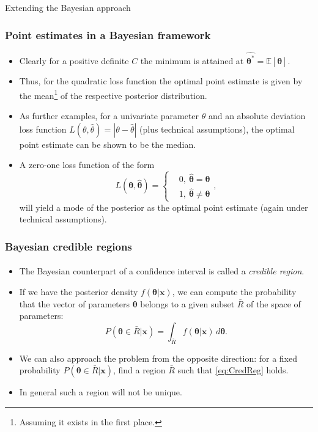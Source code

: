 \documentclass[10pt]{beamer}
\theoremstyle{definition}
\begin{document}
\begin{section}{Extending the Bayesian approach}
\begin{frame}[fragile]
\frametitle{Point estimates in a Bayesian framework}
\begin{itemize}\itemsep1em
\item Clearly for a positive definite $ C $ the minimum is attained at $\boldsymbol{\hat{\theta^*}}=\mathbb{E}[\boldsymbol{\theta}]$.
\item Thus, for the quadratic loss function the optimal point estimate is given by the mean\footnote{Assuming it exists in the first place.} of the respective posterior distribution.\bigskip \pause
\item As further examples, for a univariate parameter $ \theta $ and an absolute deviation loss function $L(\theta,\hat{\theta})=|\theta-\hat{\theta}|$ (plus technical assumptions), the optimal point estimate can be shown to be the median.
\item A zero-one loss function of the form \begin{equation*} L(\boldsymbol{\theta},\boldsymbol{\hat{\theta}})=\left\{ \begin{aligned} &0,~\boldsymbol{\hat{\theta}}=\boldsymbol{\theta}\\ &1,~\boldsymbol{\hat{\theta}}\neq\boldsymbol{\theta} \end{aligned}\right.
,\end{equation*} will yield a mode of the posterior as the optimal point estimate (again under technical assumptions).
\end{itemize}
\end{frame}

\begin{frame}[fragile]
\frametitle{Bayesian credible regions}
\framesubtitle{}
\begin{itemize}\itemsep1em
\item The Bayesian counterpart of a confidence interval is called a \emph{credible region}.
\item If we have the posterior density $f(\boldsymbol{\theta}|\mathbf{x})$, we can compute the probability that the vector of parameters $\boldsymbol{\theta}$ belongs to a given subset $\bar{R}$ of the space of parameters:
\begin{equation}
\label{eq:CredReg} P(\boldsymbol{\theta}\in
\bar{R}|\mathbf{x}) = \int_{\bar{R}}f(\boldsymbol{\theta} | \mathbf{x}) \, d\boldsymbol{\theta}.
\end{equation}\pause
\item We can also approach the problem from the opposite direction: for a fixed probability $P(\boldsymbol{\theta}\in \bar{R}|\mathbf{x})$, find a region $\bar{R}$ such that \eqref{eq:CredReg} holds.
\item In general such a region will not be unique.
\end{itemize}
\end{frame}


\end{section}
\end{document}
